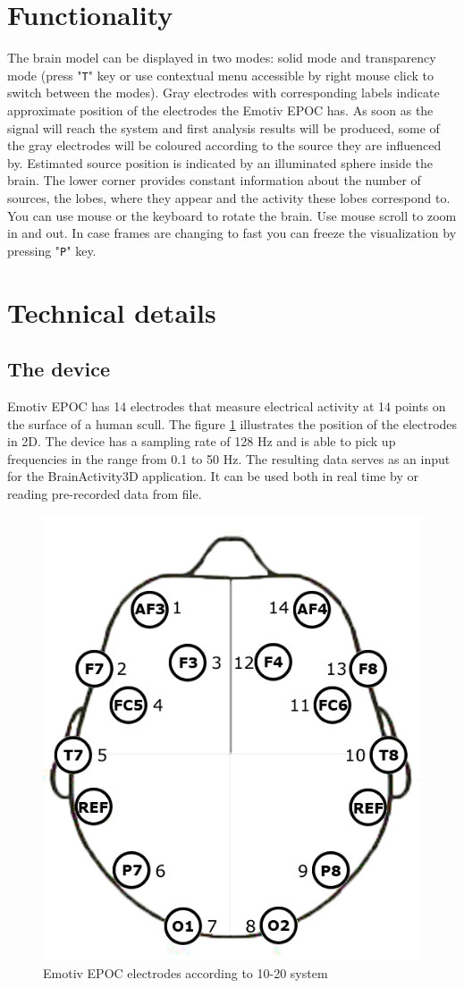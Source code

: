 \documentclass[twocolumn]{article}
\begin{document}
\thispagestyle{empty}
\clearpage

%
%
\section*{Functionality}
The brain model can be displayed in two modes: solid mode and transparency mode (press "\texttt{T}" key or use contextual menu accessible by right mouse click to switch between the modes). Gray electrodes with corresponding labels indicate approximate position of the electrodes the Emotiv EPOC has. As soon as the signal will reach the system and first analysis results will be produced, some of the gray electrodes will be coloured according to the source they are influenced by. Estimated source position is indicated by an illuminated sphere inside the brain. The lower corner provides constant information about the number of sources, the lobes, where they appear and the activity these lobes correspond to. You can use mouse or the keyboard to rotate the brain. Use mouse scroll to zoom in and out. In case frames are changing to fast you can freeze the visualization by pressing "\texttt{P}" key.

%
%
\section*{Technical details}

\subsection*{The device}

Emotiv EPOC has 14 electrodes that measure electrical activity at 14 points on the surface of a human scull. The figure \ref{fig:epoc_placement} illustrates the position of the electrodes in 2D. The device has a sampling rate of 128 Hz and is able to pick up frequencies in the range from 0.1 to 50 Hz. The resulting data serves as an input for the BrainActivity3D application. It can be used both in real time by or reading pre-recorded data from file.
\begin{figure}[!h]
\begin{center}
\includegraphics[width=0.5\columnwidth]{../Images/epoc_placement} 
\caption{Emotiv EPOC electrodes according to 10-20 system}
\label{fig:epoc_placement}
\end{center}
\end{figure}
\end{document}
